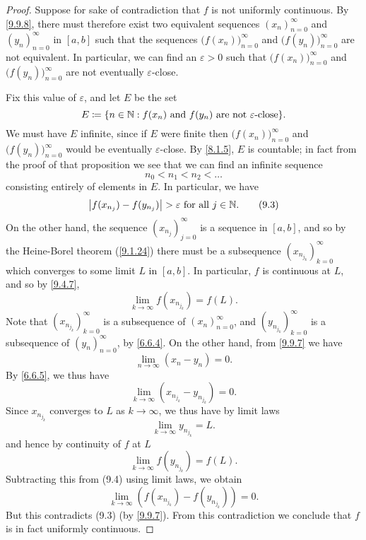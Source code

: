 \begin{proof}
  Suppose for sake of contradiction that \(f\) is not uniformly continuous.
  By \cref{9.9.8}, there must therefore exist two equivalent sequences \((x_n)_{n = 0}^\infty\) and \((y_n)_{n = 0}^\infty\) in \([a, b]\) such that the sequences \(\big(f(x_n)\big)_{n = 0}^\infty\) and \(\big(f(y_n)\big)_{n = 0}^\infty\) are not equivalent.
  In particular, we can find an \(\varepsilon > 0\) such that \(\big(f(x_n)\big)_{n = 0}^\infty\) and \(\big(f(y_n)\big)_{n = 0}^\infty\) are not eventually \(\varepsilon\)-close.

  Fix this value of \(\varepsilon\), and let \(E\) be the set
  \[
    E \coloneqq \set{n \in \N : f(x_n) \text{ and } f(y_n) \text{ are not \(\varepsilon\)-close}}.
  \]
  We must have \(E\) infinite, since if \(E\) were finite then \(\big(f(x_n)\big)_{n = 0}^\infty\) and \(\big(f(y_n)\big)_{n = 0}^\infty\) would be eventually \(\varepsilon\)-close.
  By \cref{8.1.5}, \(E\) is countable;
  in fact from the proof of that proposition we see that we can find an infinite sequence
  \[
    n_0 < n_1 < n_2 < \dots
  \]
  consisting entirely of elements in \(E\).
  In particular, we have
  \[
    \left\lvert f(x_{n_j}) - f(y_{n_j})\right\rvert > \varepsilon \text{ for all } j \in \mathbb{N}. \tag{9.3}\label{eq 9.3}
  \]
  On the other hand, the sequence \((x_{n_j})_{j = 0}^\infty\) is a sequence in \([a, b]\), and so by the Heine-Borel theorem (\cref{9.1.24}) there must be a subsequence \((x_{n_{j_k}})_{k = 0}^\infty\) which converges to some limit \(L\) in \([a, b]\).
  In particular, \(f\) is continuous at \(L\), and so by \cref{9.4.7},
  \[
    \lim_{k \to \infty} f(x_{n_{j_k}}) = f(L). \tag{9.4}\label{eq 9.4}
  \]
  Note that \((x_{n_{j_k}})_{k = 0}^\infty\) is a subsequence of \((x_n)_{n = 0}^\infty\), and \((y_{n_{j_k}})_{k = 0}^\infty\) is a subsequence of \((y_n)_{n = 0}^\infty\), by \cref{6.6.4}.
  On the other hand, from \cref{9.9.7} we have
  \[
    \lim_{n \to \infty} (x_n - y_n) = 0.
  \]
  By \cref{6.6.5}, we thus have
  \[
    \lim_{k \to \infty} (x_{n_{j_k}} - y_{n_{j_k}}) = 0.
  \]
  Since \(x_{n_{j_k}}\) converges to \(L\) as \(k \to \infty\), we thus have by limit laws
  \[
    \lim_{k \to \infty} y_{n_{j_k}} = L.
  \]
  and hence by continuity of \(f\) at \(L\)
  \[
    \lim_{k \to \infty} f(y_{n_{j_k}}) = f(L).
  \]
  Subtracting this from (9.4) using limit laws, we obtain
  \[
    \lim_{k \to \infty} (f(x_{n_{j_k}}) - f(y_{n_{j_k}})) = 0.
  \]
  But this contradicts (9.3) (by \cref{9.9.7}).
  From this contradiction we conclude that \(f\) is in fact uniformly continuous.
\end{proof}

